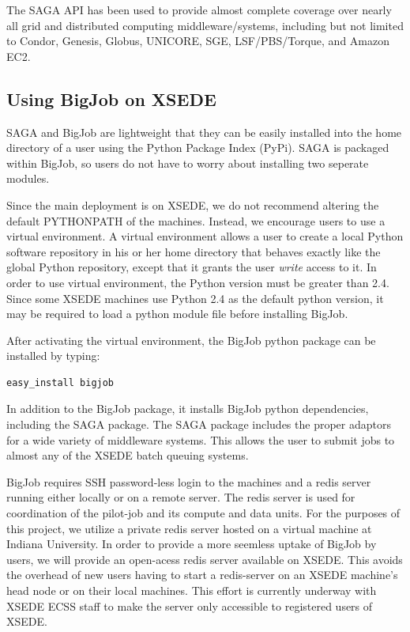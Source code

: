 \documentclass{sig-alternate}
\begin{document}
The SAGA API has been used to provide almost complete
coverage over nearly all grid and distributed computing
middleware/systems, including but not limited to Condor, Genesis,
Globus, UNICORE, SGE, LSF/PBS/Torque, and Amazon EC2.

\subsection{Using BigJob on XSEDE}

SAGA and BigJob are lightweight that they can be easily installed into
the home directory of a user using the Python Package Index
(PyPi). SAGA is packaged within BigJob, so users do not have to worry
about installing two seperate modules.

Since the main deployment is on XSEDE, we do not recommend altering
the default PYTHONPATH of the machines. Instead, we encourage users to
use a virtual environment. A virtual environment allows a user to
create a local Python software repository in his or her home directory
that behaves exactly like the global Python repository, except that it
grants the user \textit{write} access to it. In order to use virtual
environment, the Python version must be greater than 2.4. Since some
XSEDE machines use Python 2.4 as the default python version, it may be
required to load a python module file before installing BigJob.

After activating the virtual environment, the BigJob python package
can be installed by typing:

\begin{lstlisting}[frame=single]
easy_install bigjob
\end{lstlisting}

In addition to the BigJob package, it installs BigJob python
dependencies, including the SAGA package. The SAGA package includes
the proper adaptors for a wide variety of middleware systems. This
allows the user to submit jobs to almost any of the XSEDE batch
queuing systems.

BigJob requires SSH password-less login to the machines and a redis
server running either locally or on a remote server. The redis server
is used for coordination of the pilot-job and its compute and data
units. For the purposes of this project, we utilize a private redis
server hosted on a virtual machine at Indiana University. In order to
provide a more seemless uptake of BigJob by users, we will provide an
open-acess redis server available on XSEDE. This avoids the overhead
of new users having to start a redis-server on an XSEDE machine's head
node or on their local machines. This effort is currently underway
with XSEDE ECSS staff to make the server only accessible to registered
users of XSEDE.
\end{document}

